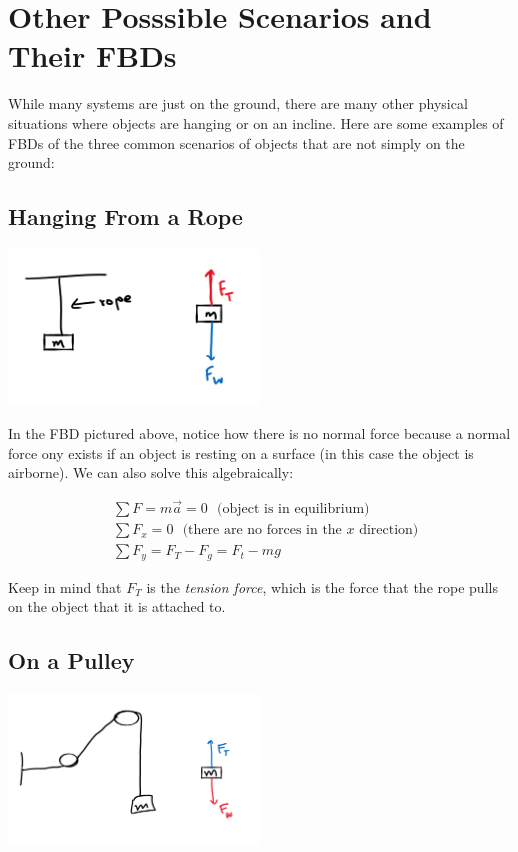 \section{Other Posssible Scenarios and Their FBDs}

While many systems are just on the ground, there are many other physical situations where objects are hanging or on an incline. Here are some examples of FBDs of the three common scenarios of objects that are not simply on the ground:

\subsection*{Hanging From a Rope}

\begin{center}
	\includegraphics[width=0.5\textwidth]{chapters/ch3/images/fig3_2.PNG}
\end{center}

In the FBD pictured above, notice how there is no normal force because a normal force ony exists if an object is resting on a surface (in this case the object is airborne). We can also solve this algebraically:

$$
	\begin{aligned}
		&\sum F = m\vec{a} = 0 \:\:\:\text{(object is in equilibrium)}\\
		&\sum F_x = 0 \:\:\:\text{(there are no forces in the $x$ direction)}\\
		&\sum F_y = F_T - F_g = F_t - mg
	\end{aligned}
$$

Keep in mind that $F_T$ is the \textit{tension force}, which is the force that the rope pulls on the object that it is attached to.

\subsection*{On a Pulley}

\begin{center}
	\includegraphics[width=0.5\textwidth]{chapters/ch3/images/fig3_3.PNG}
\end{center}

